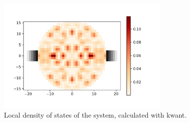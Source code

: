 \documentclass[12pt]{article}
\numberwithin{equation}{section}
\begin{document}
\newpage
\begin{figure}[h!]
  \begin{center}
  \includegraphics[width=0.75\textwidth]{./media/circular_square_lat_ldos.png}
  \caption{Local density of states of the system, calculated with kwant.}
  \label{fig:ciclat_ldos}
  \end{center}
\end{figure}
\end{document}
